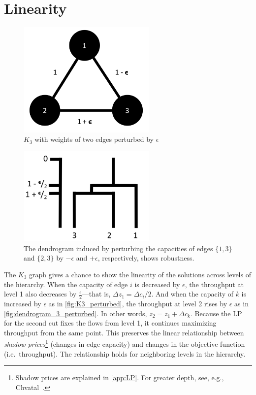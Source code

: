 \section{Linearity}

\begin{figure}
\centering
\includegraphics[width=0.6\textwidth]{fig/K3_perturbed}
\caption{$K_3$ with weights of two edges perturbed by $\epsilon$}
\label{fig:K3_perturbed}
\end{figure}

\begin{figure}
\centering
\includegraphics[width=0.6\textwidth]{fig/dendrogram_3_perturbed}
\caption{The dendrogram induced by perturbing the capacities of edges $\{1, 3\}$ and $\{2, 3\}$ by $-\epsilon$ and $+\epsilon$, respectively, shows robustness.}
\label{fig:dendrogram_3_perturbed}
\end{figure}

The $K_3$ graph gives a chance to show the linearity of the solutions across levels of the hierarchy. When the capacity of edge $i$ is decreased by $\epsilon$, the throughput at level 1 also decreases by $\frac{\epsilon}{2}$---that is, $\Delta z_1 = \Delta c_i / 2$. And when the capacity of $k$ is increased by $\epsilon$ as in \autoref{fig:K3_perturbed}, the throughput at level 2 rises by $\epsilon$ as in \autoref{fig:dendrogram_3_perturbed}. In other words, $z_2 = z_1 + \Delta c_k$. Because the LP for the second cut fixes the flows from level 1, it continues maximizing throughput from the same point. This preserves the linear relationship between \emph{shadow prices}\footnote{Shadow prices are explained in \autoref{app:LP}. For greater depth, see, e.g., Chvatal~\cite{chvatal1983linear}.} (changes in edge capacity) and changes in the objective function (i.e.\ throughput). The relationship holds for neighboring levels in the hierarchy.

